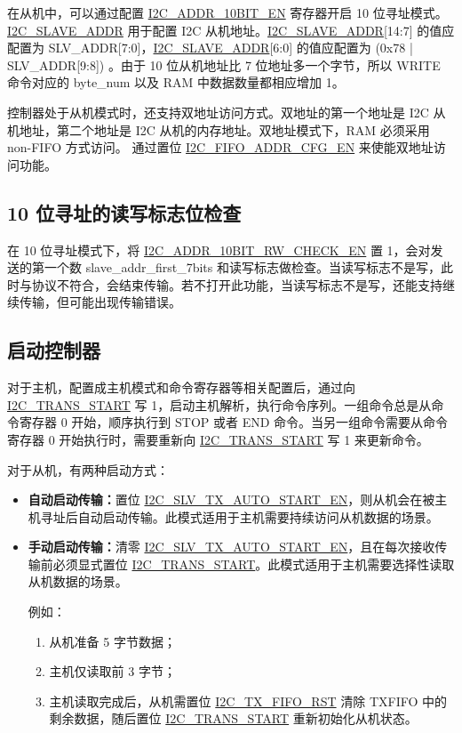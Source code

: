\documentclass[main\_\_CN.tex]{subfiles}
\begin{document}
在从机中，可以通过配置 \hyperref[fielddesc:I2CADDR10BITEN]{I2C\_ADDR\_10BIT\_EN} 寄存器开启 10 位寻址模式。 \hyperref[fielddesc:I2CSLAVEADDR]{I2C\_SLAVE\_ADDR} 用于配置 I2C 从机地址。\hyperref[fielddesc:I2CSLAVEADDR]{I2C\_SLAVE\_ADDR}[14:7] 的值应配置为 SLV\_ADDR[7:0]，\hyperref[fielddesc:I2CSLAVEADDR]{I2C\_SLAVE\_ADDR}[6:0] 的值应配置为 (0x{}78 | SLV\_ADDR[9:8]) 。由于 10 位从机地址比 7 位地址多一个字节，所以 WRITE 命令对应的 byte\_num 以及 RAM 中数据数量都相应增加 1。

控制器处于从机模式时，还支持双地址访问方式。双地址的第一个地址是 I2C 从机地址，第二个地址是 I2C 从机的内存地址。双地址模式下，RAM 必须采用 non-FIFO 方式访问。
通过置位 \hyperref[fielddesc:I2CFIFOADDRCFGEN]{I2C\_FIFO\_ADDR\_CFG\_EN} 来使能双地址访问功能。

\subsection{10 位寻址的读写标志位检查}
在 10 位寻址模式下，将 \hyperref[fielddesc:I2CADDR10BITRWCHECKEN]{I2C\_ADDR\_10BIT\_RW\_CHECK\_EN} 置 1，会对发送的第一个数 slave\_addr\_first\_7bits 和读写标志做检查。当读写标志不是写，此时与协议不符合，会结束传输。若不打开此功能，当读写标志不是写，还能支持继续传输，但可能出现传输错误。

\subsection{启动控制器}
\label{subsubsec:i2c-start}
对于主机，配置成主机模式和命令寄存器等相关配置后，通过向 \hyperref[fielddesc:I2CTRANSSTART]{I2C\_TRANS\_START} 写 1，启动主机解析，执行命令序列。一组命令总是从命令寄存器 0 开始，顺序执行到 STOP 或者 END 命令。当另一组命令需要从命令寄存器 0 开始执行时，需要重新向 \hyperref[fielddesc:I2CTRANSSTART]{I2C\_TRANS\_START} 写 1 来更新命令。

对于从机，有两种启动方式：
\begin{itemize}
    \item \textbf{自动启动传输：}置位 \hyperref[fielddesc:I2CSLVTXAUTOSTARTEN]{I2C\_SLV\_TX\_AUTO\_START\_EN}，则从机会在被主机寻址后自动启动传输。此模式适用于主机需要持续访问从机数据的场景。
    \item \textbf{手动启动传输：}清零 \hyperref[fielddesc:I2CSLVTXAUTOSTARTEN]{I2C\_SLV\_TX\_AUTO\_START\_EN}，且在每次接收传输前必须显式置位 \hyperref[fielddesc:I2CTRANSSTART]{I2C\_TRANS\_START}。此模式适用于主机需要选择性读取从机数据的场景。

例如：
\begin{enumerate}
\item 从机准备 5 字节数据；
\item 主机仅读取前 3 字节；
\item 主机读取完成后，从机需置位 \hyperref[fielddesc:I2CTXFIFORST]{I2C\_TX\_FIFO\_RST} 清除 TXFIFO 中的剩余数据，随后置位 \hyperref[fielddesc:I2CTRANSSTART]{I2C\_TRANS\_START} 重新初始化从机状态。
\end{enumerate}

\end{itemize}
\end{document}
